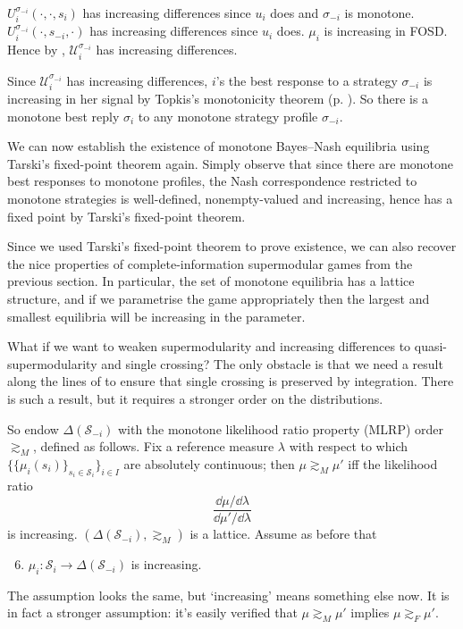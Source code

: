 \documentclass[11pt,letterpaper,reqno,oneside]{article}
\begin{document}
$U_i^{\sigma_{-i}}(\cdot,\cdot,s_i)$ has increasing differences since $u_i$ does and $\sigma_{-i}$ is monotone. $U_i^{\sigma_{-i}}(\cdot,s_{-i},\cdot)$ has increasing differences since $u_i$ does. $\mu_i$ is increasing in FOSD. Hence by , $\mathcal{U}_i^{\sigma_{-i}}$ has increasing differences.

Since $\mathcal{U}_i^{\sigma_{-i}}$ has increasing differences, $i$'s the best response to a strategy $\sigma_{-i}$ is increasing in her signal by Topkis's monotonicity theorem (p. \pageref{theorem:Topkis}). So there is a monotone best reply $\sigma_i$ to any monotone strategy profile $\sigma_{-i}$.

We can now establish the existence of monotone Bayes--Nash equilibria using Tarski's fixed-point theorem again. Simply observe that since there are monotone best responses to monotone profiles, the Nash correspondence restricted to monotone strategies is well-defined, nonempty-valued and increasing, hence has a fixed point by Tarski's fixed-point theorem.

Since we used Tarski's fixed-point theorem to prove existence, we can also recover the nice properties of complete-information supermodular games from the previous section. In particular, the set of monotone equilibria has a lattice structure, and if we parametrise the game appropriately then the largest and smallest equilibria will be increasing in the parameter.

What if we want to weaken supermodularity and increasing differences to quasi-supermodularity and single crossing? The only obstacle is that we need a result along the lines of  to ensure that single crossing is preserved by integration. There is such a result, but it requires a stronger order on the distributions.

So endow $\Delta( \mathcal{S}_{-i} )$ with the monotone likelihood ratio property (MLRP) order $\gtrsim_M$, defined as follows. Fix a reference measure $\lambda$ with respect to which $\{ \{ \mu_i(s_i) \}_{s_i \in \mathcal{S}_i} \}_{i \in I}$ are absolutely continuous; then $\mu \gtrsim_M \mu'$ iff the likelihood ratio
%
\begin{equation*}
	\frac{ \dd \mu / \dd \lambda }{ \dd \mu' / \dd \lambda }
\end{equation*}
%
is increasing. $\left( \Delta( \mathcal{S}_{-i} ), \gtrsim_M \right)$ is a lattice. Assume as before that
%
\begin{enumerate}
	
	\setcounter{enumi}{5}

	\item $\mu_i : \mathcal{S}_i \to \Delta( \mathcal{S}_{-i} )$ is increasing.

\end{enumerate}
%
The assumption looks the same, but `increasing' means something else now. It is in fact a stronger assumption: it's easily verified that $\mu \gtrsim_M \mu'$ implies $\mu \gtrsim_F \mu'$.
\end{document}
